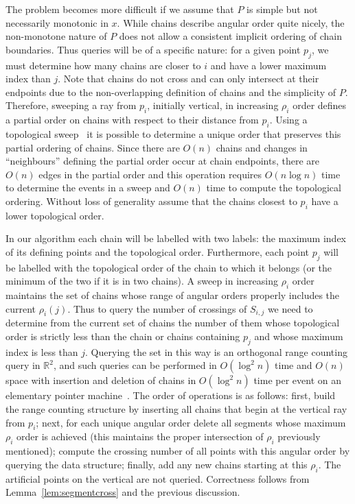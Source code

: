 \documentclass{article}
\begin{document}
The problem becomes more difficult
if we assume that $P$ is simple but not necessarily monotonic in $x$.
While chains describe angular order quite
nicely, the non-monotone nature of $P$ does not allow a consistent
implicit ordering of chain boundaries.  Thus queries will be of a specific
nature: for a given point $p_j$, we must determine how many chains are
closer to $i$ and have a lower maximum index than $j$.  Note that chains do
not cross and can only intersect at their endpoints due to the
non-overlapping definition of chains and the simplicity of $P$.  Therefore,
sweeping a ray from $p_i$, initially vertical, in increasing $\rho_i$ order
defines a partial order on chains with respect to their distance from $p_i$. 
Using a topological sweep~\cite[p.~481]{skiena:2008uq} it is possible to
determine a unique order that preserves this partial ordering of chains. 
Since there are $O(n)$ chains and changes in ``neighbours'' defining the
partial order occur at chain endpoints, there are $O(n)$ edges in the partial
order and this operation requires $O(n\log n)$ time to determine the events
in a sweep and $O(n)$ time to compute the topological ordering.  Without
loss of generality assume that the chains closest to $p_i$ have a lower
topological order.

In our algorithm each chain will be labelled with two labels: the maximum
index of its defining points and the topological order.  Furthermore, each
point $p_j$ will be labelled with the topological order of the chain to which 
it belongs (or the minimum of the two if it is in two chains).  A sweep in
increasing $\rho_i$ order maintains the set of chains whose range of angular
orders properly includes the current $\rho_i(j)$.  Thus to query the number
of crossings of $S_{i,j}$ we need to determine from the current set of
chains the number of them whose topological order is strictly less than the
chain or chains containing $p_j$ and whose maximum index is less than $j$. 
Querying the set in this way is an orthogonal range counting query in
$\mathbb{R}^2$, and such queries can be performed in $O(\log^2n)$ time and
$O(n)$ space with insertion and deletion of chains in $O(\log^2n)$ time per
event on an elementary pointer machine~\cite{chazelle:1988vn}.  The order of
operations is as follows: first, build the range counting structure by
inserting all chains that begin at the vertical ray from $p_i$; next, for
each unique angular order delete all segments whose maximum $\rho_i$ order
is achieved (this maintains the proper intersection of $\rho_i$ previously
mentioned); compute the crossing number of all points with this angular
order by querying the data structure; finally, add any new chains starting
at this $\rho_i$.  The artificial points on the vertical are not queried. 
Correctness follows from Lemma~\ref{lem:segmentcross} and the
previous discussion.
\end{document}
